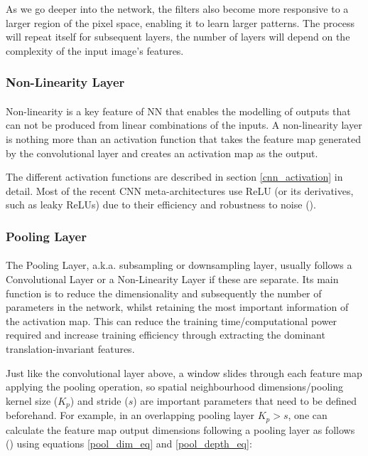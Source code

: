 As we go deeper into the network, the filters also become more responsive to a larger region of the pixel space, enabling it to learn larger patterns. The process will repeat itself for subsequent layers, the number of layers will depend on the complexity of the input image's features.

\subsubsection{Non-Linearity Layer}
\paragraph{}
Non-linearity is a key feature of \gls{NN} that enables the modelling of outputs that can not be produced from linear combinations of the inputs. A non-linearity layer is nothing more than an activation function that takes the feature map generated by the convolutional layer and creates an activation map as the output. 

The different activation functions are described in section \ref{cnn_activation} in detail. Most of the recent \gls{CNN} meta-architectures use \gls{ReLU} (or its derivatives, such as leaky \gls{ReLU}s) due to their efficiency and robustness to noise (\cite{he2015delving}).

\subsubsection{Pooling Layer}
\paragraph{}
The Pooling Layer, \gls{a.k.a.} subsampling or downsampling layer, usually follows a Convolutional Layer or a Non-Linearity Layer if these are separate. 
Its main function is to reduce the dimensionality and subsequently the number of parameters in the network, whilst retaining the most important information of the activation map. This can reduce the training time/computational power required and increase training efficiency through extracting the dominant translation-invariant features.


Just like the convolutional layer above, a window slides through each feature map applying the pooling operation, so spatial neighbourhood dimensions/pooling kernel size ($K_p$) and stride ($s$) are important parameters that need to be defined beforehand. For example, in an overlapping pooling layer $K_p > s$, one can calculate the feature map output dimensions following a pooling layer as follows (\cite{dumoulin2018guide}) using equations \ref{pool_dim_eq} and \ref{pool_depth_eq}:

